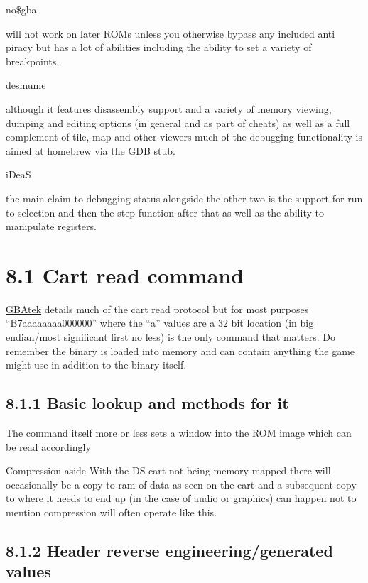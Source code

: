 \documentclass[
]{book}
\begin{document}
no\$gba

will not work on later ROMs unless you otherwise bypass any included anti piracy but has a lot of abilities including the ability to set a variety of breakpoints.

desmume

although it features disassembly support and a variety of memory viewing, dumping and editing options (in general and as part of cheats) as well as a full complement of tile, map and other viewers much of the debugging functionality is aimed at homebrew via the GDB stub.

iDeaS

the main claim to debugging status alongside the other two is the support for run to selection and then the step function after that as well as the ability to manipulate registers.

\hypertarget{cart-read-command}{%
\section{8.1 Cart read command}\label{cart-read-command}}

\href{http://problemkaputt.de/gbatek.htm\#dscartridgeprotocol}{GBAtek} details much of the cart read protocol but for most purposes ``B7aaaaaaaa000000'' where the ``a'' values are a 32 bit location (in big endian/most significant first no less) is the only command that matters. Do remember the binary is loaded into memory and can contain anything the game might use in addition to the binary itself.

\hypertarget{basic-lookup-and-methods-for-it}{%
\subsection{8.1.1 Basic lookup and methods for it}\label{basic-lookup-and-methods-for-it}}

The command itself more or less sets a window into the ROM image which can be read accordingly

Compression aside With the DS cart not being memory mapped there will occasionally be a copy to ram of data as seen on the cart and a subsequent copy to where it needs to end up (in the case of audio or graphics) can happen not to mention compression will often operate like this.

\hypertarget{header-reverse-engineeringgenerated-values}{%
\subsection{8.1.2 Header reverse engineering/generated values}\label{header-reverse-engineeringgenerated-values}}
\end{document}
